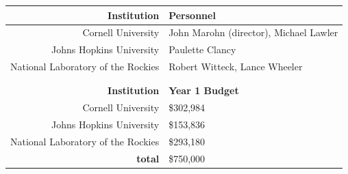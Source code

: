 \documentclass[../main.tex]{subfiles}
\begin{document}
\vspace{12pt}

\begin{center}
\begin{tabular}{r l}
\toprule
\textbf{Institution} & \textbf{Personnel} \\
\midrule
Cornell University &  John Marohn (director), Michael Lawler  \\
Johns Hopkins University &  Paulette Clancy \\ 
National Laboratory of the Rockies & Robert Witteck, Lance Wheeler \\
\bottomrule
 & \\
 & \\
\toprule
\textbf{Institution} & \textbf{Year 1 Budget} \\
\midrule
Cornell University &  \$302,984 \\ 
Johns Hopkins University &  \$153,836 \\
National Laboratory of the Rockies & \$293,180 \\ 
\midrule
\textbf{total} & \$750,000 \\
\bottomrule
\end{tabular}
\end{center}
\end{document}
